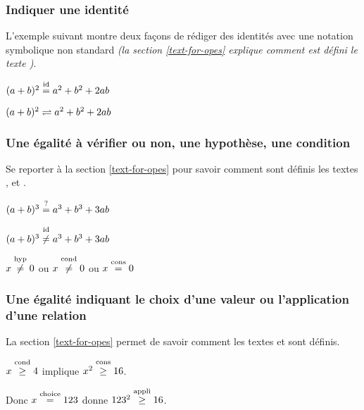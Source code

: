 \documentclass[12pt,a4paper]{article}
\theoremstyle{definition}
\begin{document}


\subsubsection{Indiquer une identité}

L'exemple suivant montre deux façons de rédiger des identités avec une notation symbolique non standard \emph{(la section \ref{text-for-opes} explique comment est défini le texte \emph{\og \textopid \fg})}.

\begin{latexex}
$(a + b)^2 \eqid a^2 + b^2 + 2 a b$

$(a + b)^2 \eqid* a^2 + b^2 + 2 a b$
\end{latexex}




\subsubsection{Une égalité à vérifier ou non, une hypothèse, une condition}

Se reporter à la section \ref{text-for-opes} pour savoir comment sont définis les textes \emph{\og \textopcons \fg} , \emph{\og \textopcond \fg} et \emph{\og \textophyp \fg}.

\begin{latexex}
$(a + b)^3 \eqtest a^3 + b^3 + 3 a b$

$(a + b)^3 \neqid a^3 + b^3 + 3 a b$

$x \neqhyp 0$  ou
$x \neqcond 0$ ou
$x \eqcons 0$
\end{latexex}




\subsubsection{Une égalité indiquant le choix d'une valeur ou l'application d'une relation}

La section \ref{text-for-opes} permet de savoir comment les textes \emph{\og \textopchoice \fg} et \emph{\og \textopappli \fg} sont définis.

\begin{latexex}
$x \geqcond 4$ implique
$x^2 \geqcons 16$.

Donc $x \eqchoice 123$ donne
$123^2 \geqappli 16$.
\end{latexex}


\end{document}

